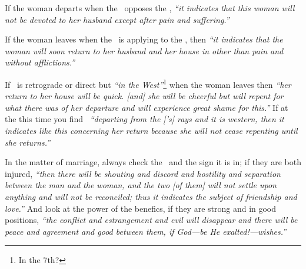 If  the woman departs when the \Moon\, opposes the \Sun, \textsl{``it indicates that this woman will not be devoted to her husband except after pain and suffering.''}

If  the woman leaves when the \Moon\, is applying to the \Sun, then \textsl{``it indicates that the woman will soon return to her husband and her house in other than pain and without afflictions.''}

If  \Venus\, is retrograde or direct but \textsl{``in the West''}\footnote{In the 7th?} when the woman leaves then \textsl{``her return to her house will be quick. [and] she will be cheerful but will repent for what there was of her departure and will experience great shame for this.''} If at the this time you find \Venus\, \textsl{``departing from the [\Sun's] rays and it is western, then it indicates like this concerning her return because she will not cease repenting until she returns.''}

In the matter of marriage, always check  the \Moon\, and the sign it is in; if they are both injured, \textsl{``then there will be shouting and discord and hostility and separation between the man and the woman, and the two [of them] will not settle upon anything and will not be reconciled; thus it indicates the subject of friendship and love.''} And look at the power of the benefics, if they are strong and in good positions, \textsl{``the conflict and estrangement and evil will disappear and there will be peace and agreement and good between them, if God---be He exalted!---wishes.''}

